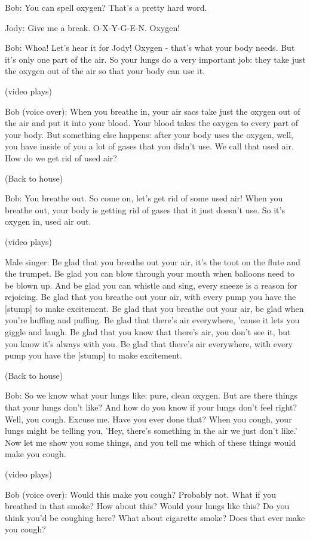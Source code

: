 Bob: You can spell oxygen? That's a pretty hard word.

Jody: Give me a break. O-X-Y-G-E-N. Oxygen!

Bob: Whoa! Let's hear it for Jody! Oxygen - that's what your body needs. But it's only one part of the air. So your lungs do a very important job: they take just the oxygen out of the air so that your body can use it.

(video plays)

Bob (voice over): When you breathe in, your air sacs take just the oxygen out of the air and put it into your blood. Your blood takes the oxygen to every part of your body. But something else happens: after your body uses the oxygen, well, you have inside of you a lot of gases that you didn't use. We call that used air. How do we get rid of used air?

(Back to house)

Bob: You breathe out. So come on, let's get rid of some used air! When you breathe out, your body is getting rid of gases that it just doesn't use. So it's oxygen in, used air out.

(video plays)

Male singer: Be glad that you breathe out your air, it's the toot on the flute and the trumpet. Be glad you can blow through your mouth when balloons need to be blown up. And be glad you can whistle and sing, every sneeze is a reason for rejoicing. Be glad that you breathe out your air, with every pump you have the [stump] to make excitement. Be glad that you breathe out your air, be glad when you're huffing and puffing. Be glad that there's air everywhere, 'cause it lets you giggle and laugh. Be glad that you know that there's air, you don't see it, but you know it's always with you. Be glad that there's air everywhere, with every pump you have the [stump] to make excitement.

(Back to house)

Bob: So we know what your lungs like: pure, clean oxygen. But are there things that your lungs don't like? And how do you know if your lungs don't feel right? Well, you cough. Excuse me. Have you ever done that? When you cough, your lungs might be telling you, 'Hey, there's something in the air we just don't like.' Now let me show you some things, and you tell me which of these things would make you cough.

(video plays)

Bob (voice over): Would this make you cough? Probably not. What if you breathed in that smoke? How about this? Would your lungs like this? Do you think you'd be coughing here? What about cigarette smoke? Does that ever make you cough?

